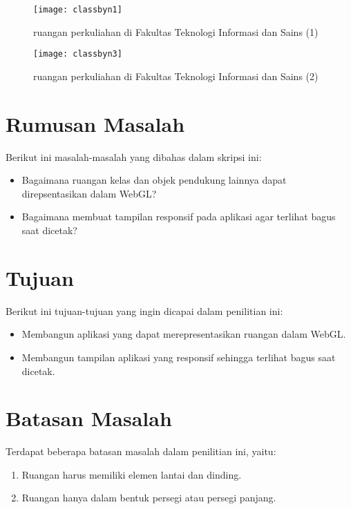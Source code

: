 \begin{figure}
	\centering
	\texttt{[image: classbyn1]}
	\caption{ruangan perkuliahan di Fakultas Teknologi Informasi dan Sains (1)}
	\vspace{8mm}
	\texttt{[image: classbyn3]}
	\caption{ruangan perkuliahan di Fakultas Teknologi Informasi dan Sains (2)}
\end{figure}

\section{Rumusan Masalah}
\label{sec:rumusan}
Berikut ini masalah-masalah yang dibahas dalam skripsi ini:
\begin{itemize}
    \item Bagaimana ruangan kelas dan objek pendukung lainnya dapat direpsentasikan dalam WebGL?
    \item Bagaimana membuat tampilan responsif pada aplikasi agar terlihat bagus saat dicetak?
\end{itemize}

\section{Tujuan}
\label{sec:tujuan}
Berikut ini tujuan-tujuan yang ingin dicapai dalam penilitian ini:
\begin{itemize}
    \item Membangun aplikasi yang dapat merepresentasikan ruangan dalam WebGL.
    \item Membangun tampilan aplikasi yang responsif sehingga terlihat bagus saat dicetak.
\end{itemize}

\section{Batasan Masalah}
\label{sec:batasan}
Terdapat beberapa batasan masalah dalam penilitian ini, yaitu:
\begin{enumerate}
    \item Ruangan harus memiliki elemen lantai dan dinding.
    \item Ruangan hanya dalam bentuk persegi atau persegi panjang.
\end{enumerate}
